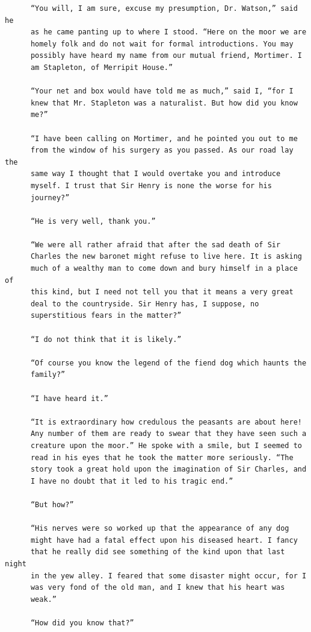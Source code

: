 \documentclass{article}
\begin{document}
\begin{verbatim}
      “You will, I am sure, excuse my presumption, Dr. Watson,” said he
      as he came panting up to where I stood. “Here on the moor we are
      homely folk and do not wait for formal introductions. You may
      possibly have heard my name from our mutual friend, Mortimer. I
      am Stapleton, of Merripit House.”

      “Your net and box would have told me as much,” said I, “for I
      knew that Mr. Stapleton was a naturalist. But how did you know
      me?”

      “I have been calling on Mortimer, and he pointed you out to me
      from the window of his surgery as you passed. As our road lay the
      same way I thought that I would overtake you and introduce
      myself. I trust that Sir Henry is none the worse for his
      journey?”

      “He is very well, thank you.”

      “We were all rather afraid that after the sad death of Sir
      Charles the new baronet might refuse to live here. It is asking
      much of a wealthy man to come down and bury himself in a place of
      this kind, but I need not tell you that it means a very great
      deal to the countryside. Sir Henry has, I suppose, no
      superstitious fears in the matter?”

      “I do not think that it is likely.”

      “Of course you know the legend of the fiend dog which haunts the
      family?”

      “I have heard it.”

      “It is extraordinary how credulous the peasants are about here!
      Any number of them are ready to swear that they have seen such a
      creature upon the moor.” He spoke with a smile, but I seemed to
      read in his eyes that he took the matter more seriously. “The
      story took a great hold upon the imagination of Sir Charles, and
      I have no doubt that it led to his tragic end.”

      “But how?”

      “His nerves were so worked up that the appearance of any dog
      might have had a fatal effect upon his diseased heart. I fancy
      that he really did see something of the kind upon that last night
      in the yew alley. I feared that some disaster might occur, for I
      was very fond of the old man, and I knew that his heart was
      weak.”

      “How did you know that?”


\end{verbatim}
\end{document}
